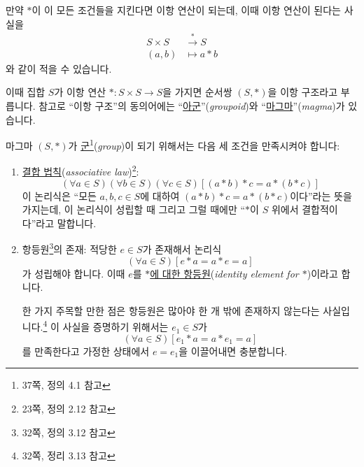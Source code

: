 \documentclass[12pt]{paper}
\begin{document}
  만약 $*$이 이 모든 조건들을 지킨다면 이항 연산이 되는데, 이때 이항 연산이 된다는 사실을
  \begin{align*}
    S \times S & \xrightarrow{*} S \\
    \left( a , b \right) & \mapsto a * b
  \end{align*}
  와 같이 적을 수 있습니다.

  이때 집합 $S$가 이항 연산 $* : S \times S \to S$을 가지면 순서쌍 $\left( S , * \right)$을 이항 구조라고 부릅니다.
  참고로 ``이항 구조''의 동의어에는 ``\underline{아군}''(\textit{groupoid})와 ``\underline{마그마}''(\textit{magma})가 있습니다.

  마그마 $ \left( S , * \right) $가 \underline{군}\footnote{\cite{fraleigh2009} 37쪽, 정의 4.1 참고}(\textit{group})이 되기 위해서는 다음 세 조건을 만족시켜야 합니다:
  \begin{enumerate}
    \item \underline{결합 법칙}(\textit{associative law})\footnote{\cite{fraleigh2009} 23쪽, 정의 2.12 참고}:
    \begin{equation*}
      \left( \forall a \in S \right) \left( \forall b \in S \right) \left( \forall c \in S \right) \left[ \left( a * b \right) * c = a * \left( b * c \right) \right] \tag{1}
    \end{equation*}
    이 논리식은 ``모든 $a , b , c \in S$에 대하여 $\left( a * b \right) * c = a * \left( b * c \right)$이다''라는 뜻을 가지는데,
    이 논리식이 성립할 때 그리고 그럴 때에만 ``$*$이 $S$ 위에서 결합적이다''라고 말합니다.

    \item 항등원\footnote{\cite{fraleigh2009} 32쪽, 정의 3.12 참고}의 존재:
    적당한 $e \in S$가 존재해서 논리식
    \begin{equation*}
      \left( \forall a \in S \right) \left[ e * a = a * e = a \right] \tag{2}
    \end{equation*}
    가 성립해야 합니다.
    이때 $e$를 \underline{$*$에 대한 항등원}(\textit{identity element for $*$})이라고 합니다.
    
    한 가지 주목할 만한 점은 항등원은 많아야 한 개 밖에 존재하지 않는다는 사실입니다.\footnote{\cite{fraleigh2009} 32쪽, 정리 3.13 참고}
    이 사실을 증명하기 위해서는 $e_1 \in S$가 
    \begin{equation*}
      \left( \forall a \in S \right) \left[ e_1 * a = a * e_1 = a \right] \tag{2-1}
    \end{equation*}
    를 만족한다고 가정한 상태에서 $e = e_1$을 이끌어내면 충분합니다.
    

\end{enumerate}
\end{document}
